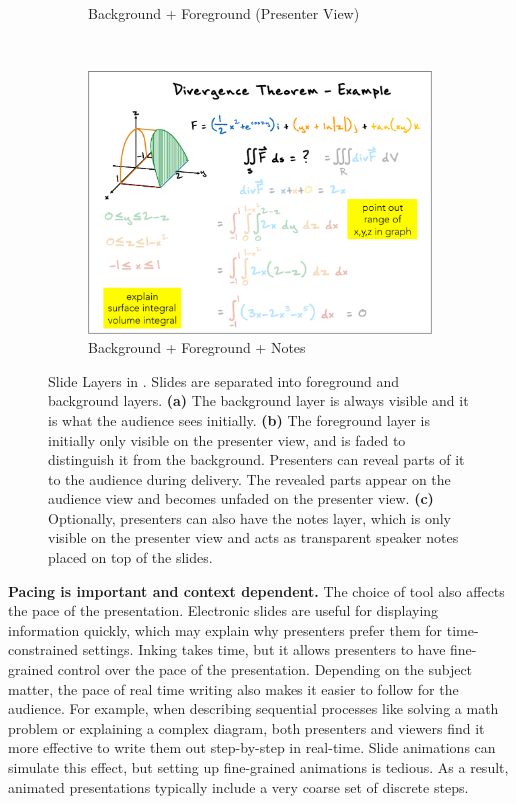 \begin{figure}[ht!]
\begin{subfigure}[t]{0.32\textwidth}
        \caption{Background + Foreground (Presenter View)}
    \end{subfigure}
    ~
        \begin{subfigure}[t]{0.32\textwidth}
        \centering
        \includegraphics[width=1\columnwidth]{figures/videoslide3}
        \caption{Background + Foreground + Notes}
    \end{subfigure}
    \caption{Slide Layers in \interface. Slides are separated into foreground and background layers. \textbf{(a)} The background layer is always visible and it is what the audience sees initially. \textbf{(b)} The foreground layer is initially only visible on the presenter view, and is faded to distinguish it from the background. Presenters can reveal parts of it to the audience during delivery. The revealed parts appear on the audience view and becomes unfaded on the presenter view. \textbf{(c)} Optionally, presenters can also have the notes layer, which is only visible on the presenter view and acts as transparent speaker notes placed on top of the slides. }
    \label{fig:slidelayers}
\end{figure}

\textbf{Pacing is important and context dependent.} 
The choice of tool also affects the pace of the presentation. Electronic slides are useful for displaying information quickly, which may explain why presenters prefer them for time-constrained settings. Inking takes time, but it allows presenters to have fine-grained control over the pace of the presentation. Depending on the subject matter, the pace of real time writing also makes it easier to follow for the audience. For example, when describing sequential processes like solving a math problem or explaining a complex diagram, both presenters and viewers find it more effective to write them out step-by-step in real-time. Slide animations can simulate this effect, but setting up fine-grained animations is tedious. As a result, animated presentations typically include a very coarse set of discrete steps. 

